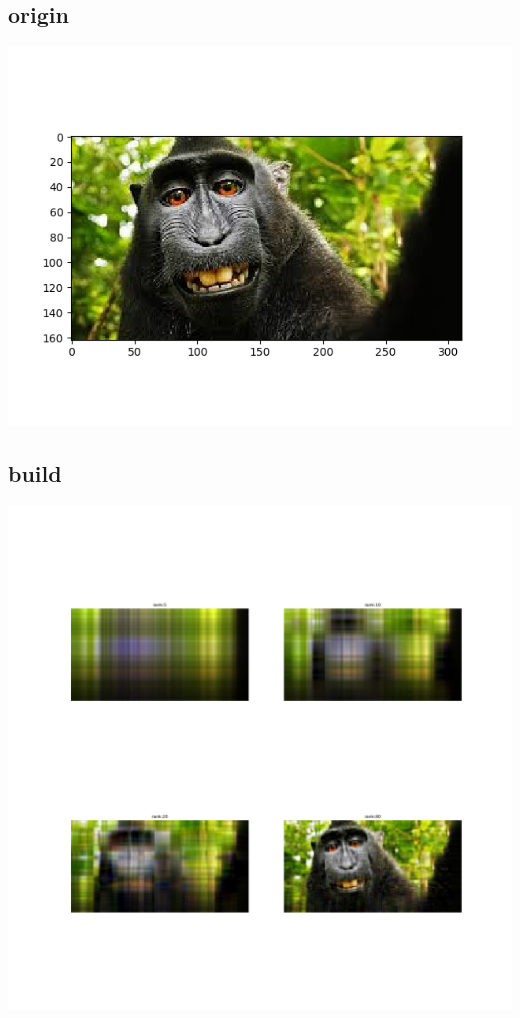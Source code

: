 \documentclass[a4paper, 11pt]{article}
\begin{document}
\subsection*{origin}
\includegraphics[scale=0.5]{pic.png}

\subsection*{build}
\includegraphics[scale=0.3]{28.png}
\end{document}
